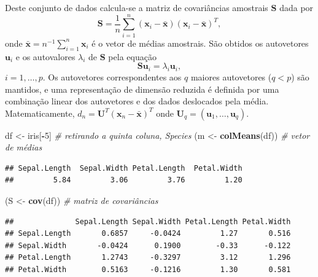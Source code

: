 \documentclass[
]{book}
\newenvironment{Shaded}{\begin{snugshade}}{\end{snugshade}}
\newcommand{\CommentTok}[1]{\textcolor[rgb]{0.56,0.35,0.01}{\textit{#1}}}
\newcommand{\DecValTok}[1]{\textcolor[rgb]{0.00,0.00,0.81}{#1}}
\newcommand{\KeywordTok}[1]{\textcolor[rgb]{0.13,0.29,0.53}{\textbf{#1}}}
\newcommand{\NormalTok}[1]{#1}
\newcommand{\OperatorTok}[1]{\textcolor[rgb]{0.81,0.36,0.00}{\textbf{#1}}}
\newcommand{\StringTok}[1]{\textcolor[rgb]{0.31,0.60,0.02}{#1}}
\theoremstyle{definition}
\theoremstyle{definition}
\theoremstyle{definition}
\theoremstyle{remark}
\begin{document}
Deste conjunto de dados calcula-se a matriz de covariâncias amostrais \(\boldsymbol{S}\) dada por
\begin{equation}
\boldsymbol{S} = \dfrac{1}{n} \sum_{i=1}^{n} (\boldsymbol{x}_{i} - \bar{\boldsymbol{x}}) (\boldsymbol{x}_{i} - \bar{\boldsymbol{x}})^T,
\label{eq:cov}
\end{equation}
onde \(\bar{\boldsymbol{x}} = n^{-1} \sum_{i=1}^{n} \boldsymbol{x}_{i}\) é o vetor de médias amostrais. São obtidos os autovetores \(\boldsymbol{u}_i\) e os autovalores \(\lambda_i\) de \(\boldsymbol{S}\) pela equação
\begin{equation}
\boldsymbol{Su}_i = \lambda_i \boldsymbol{u}_i,
\label{eq:av}
\end{equation}
\(i=1,\ldots,p\). Os autovetores correspondentes aos \(q\) maiores autovetores (\(q<p\)) são mantidos, e uma representação de dimensão reduzida é definida por uma combinação linear dos autovetores e dos dados deslocados pela média. Matematicamente, \(d_n=\boldsymbol{U}^T(\boldsymbol{x}_n - \boldsymbol{\bar{x}})^T\) onde \(\boldsymbol{U}_q=(\boldsymbol{u}_1,\ldots,\boldsymbol{u}_q)\).

\begin{Shaded}
\begin{Highlighting}[]
\NormalTok{df \textless{}{-}}\StringTok{ }\NormalTok{iris[}\OperatorTok{{-}}\DecValTok{5}\NormalTok{]      }\CommentTok{\# retirando a quinta coluna, \textquotesingle{}Species\textquotesingle{}}
\NormalTok{(m \textless{}{-}}\StringTok{ }\KeywordTok{colMeans}\NormalTok{(df)) }\CommentTok{\# vetor de médias}
\end{Highlighting}
\end{Shaded}

\begin{verbatim}
## Sepal.Length  Sepal.Width Petal.Length  Petal.Width 
##         5.84         3.06         3.76         1.20
\end{verbatim}

\begin{Shaded}
\begin{Highlighting}[]
\NormalTok{(S \textless{}{-}}\StringTok{ }\KeywordTok{cov}\NormalTok{(df))      }\CommentTok{\# matriz de covariâncias}
\end{Highlighting}
\end{Shaded}

\begin{verbatim}
##              Sepal.Length Sepal.Width Petal.Length Petal.Width
## Sepal.Length       0.6857     -0.0424         1.27       0.516
## Sepal.Width       -0.0424      0.1900        -0.33      -0.122
## Petal.Length       1.2743     -0.3297         3.12       1.296
## Petal.Width        0.5163     -0.1216         1.30       0.581
\end{verbatim}
\end{document}

